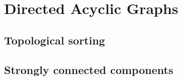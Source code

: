 \chapter{Directed Acyclic Graphs}
\label{chap:dags}

\section{Topological sorting}

\section{Strongly connected components}